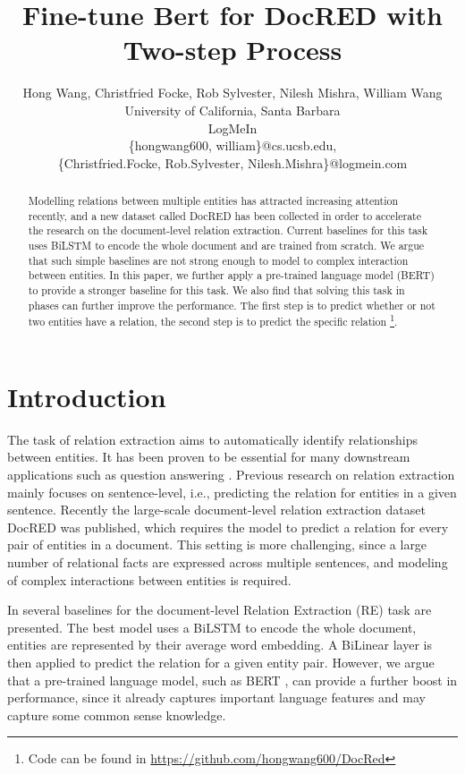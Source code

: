 \documentclass[11pt,a4paper]{article}
\title{Fine-tune Bert for DocRED with Two-step Process}
\author{
 Hong Wang,
 Christfried Focke, 
 Rob Sylvester, 
 Nilesh Mishra,
 William Wang
\\
  University of California, Santa Barbara\\
  LogMeIn\\
 \{hongwang600, william\}@cs.ucsb.edu,\\
 \{Christfried.Focke, Rob.Sylvester, Nilesh.Mishra\}@logmein.com
 }
\date{}
\begin{document}
\maketitle
\begin{abstract}
  Modelling relations between multiple entities has attracted increasing attention recently, and a new dataset called DocRED has been collected in order to accelerate the research on the document-level relation extraction. Current baselines for this task uses BiLSTM to encode the whole document and are trained from scratch. We argue that such simple baselines are not strong enough to model to complex interaction between entities. In this paper, we further apply a pre-trained language model (BERT) to provide a stronger baseline for this task. We also find that solving this task in phases can further improve the performance. The first step is to predict whether or not two entities have a relation, the second step is to predict the specific relation \footnote{Code can be found in \url{https://github.com/hongwang600/DocRed}}.
\end{abstract}



\section{Introduction}

The task of relation extraction aims to automatically identify relationships between entities. It has been proven to be essential for many downstream applications such as question answering \cite{KBQA_Yih,KBQA_Mo}. Previous research \cite{SocherHMN12,ZengLLZZ14,ZengLC015,SantosXZ15,XiaoL16,BiLSTM_RE,LinSLLS16,WuBR17,WangXQ18a,HanYLSL18,mo_acl19} on relation extraction mainly focuses on sentence-level, i.e., predicting the relation for entities in a given sentence. Recently the large-scale document-level relation extraction dataset DocRED \cite{yao2019DocRED} was published, which requires the model to predict a relation for every pair of entities in a document. This setting is more challenging, since a large number of relational facts are expressed across multiple sentences, and modeling of complex interactions between entities is required.

In \cite{yao2019DocRED} several baselines for the document-level Relation Extraction (RE) task are presented. The best model uses a BiLSTM \cite{BiLSTM} to encode the whole document, entities are represented by their average word embedding. A BiLinear layer is then applied to predict the relation for a given entity pair. However, we argue that a pre-trained language model, such as BERT \cite{BERT}, can provide a further boost in performance, since it already captures important language features and may capture some common sense knowledge.
\end{document}
